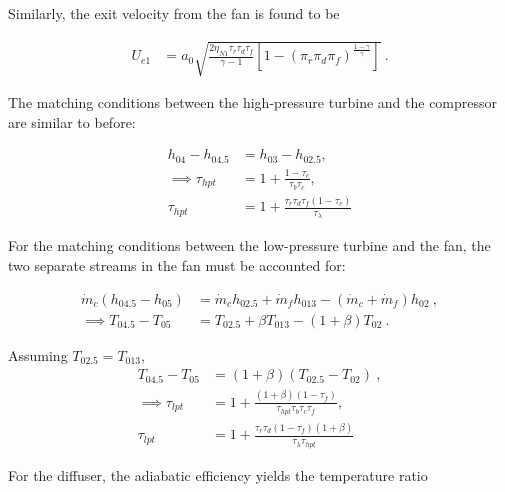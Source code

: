 \documentclass[12pt]{article}
\begin{document}
\begin{enumerate}[label=(\alph*)]
\begin{enumerate}[label=(\roman{*})]
				Similarly, the exit velocity from the fan is found to be
				
				\begin{equation}					
					\begin{aligned}
						U_{e1}&=\boxed{a_0\sqrt{\frac{2\eta_{N1}\tau_r\tau_d\tau_f}{\gamma-1}\left[1-\left(\pi_r\pi_d\pi_f \right)^{\frac{1-\gamma}{\gamma}}\right]}}\ .  
					\end{aligned}
				\end{equation}
				
				The matching conditions between the high-pressure turbine and the compressor are similar to before:
				
				\begin{equation}
					\begin{aligned}
						h_{04}-h_{04.5}&=h_{03}-h_{02.5}, \\
						\implies \tau_{hpt}&=1+\frac{1-\tau_c}{\tau_b\tau_c}, \\
						\tau_{hpt}&=\boxed{1+\frac{\tau_r\tau_d\tau_f(1-\tau_c)}{\tau_\lambda}}
					\end{aligned}
				\end{equation}
				
				For the matching conditions between the low-pressure turbine and the fan, the two separate streams in the fan must be accounted for: 
				
				\begin{equation}
					\begin{aligned}
						\dot{m}_c(h_{04.5}-h_{05})&=\dot{m}_c h_{02.5}+\dot{m}_f h_{013}-(\dot{m}_c+\dot{m}_f)h_{02}\ , \\
						\implies T_{04.5}-T_{05}&=T_{02.5}+\beta T_{013}-(1+\beta)T_{02}\ .
					\end{aligned}
				\end{equation}
				
				Assuming $T_{02.5}=T_{013}$,
				 \begin{equation}
					 \begin{aligned}
						 T_{04.5}-T_{05}&=(1+\beta)(T_{02.5}-T_{02})\ , \\
						 \implies \tau_{lpt}&=1+\frac{(1+\beta)(1-\tau_f)}{\tau_{hpt}\tau_b\tau_c\tau_f}, \\
						 \tau_{lpt}&=\boxed{1+\frac{\tau_r\tau_d(1-\tau_f)(1+\beta)}{\tau_\lambda\tau_{hpt}}}
					 \end{aligned}
				 \end{equation}
				 
				 For the diffuser, the adiabatic efficiency yields the temperature ratio
				 

\end{enumerate}
\end{enumerate}
\end{document}
